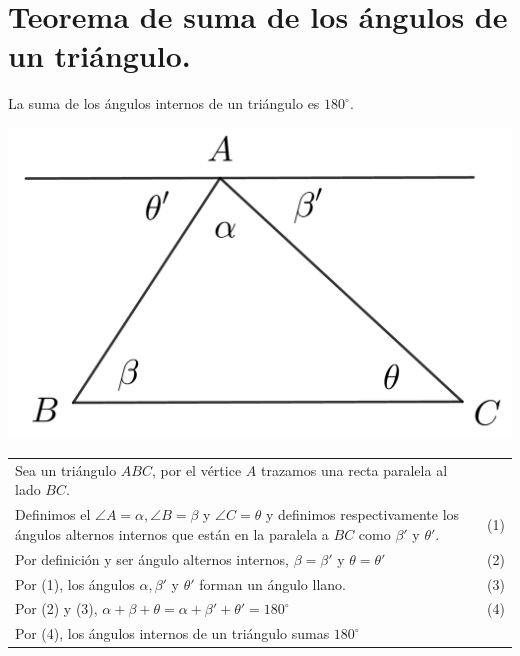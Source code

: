 \documentclass[12pt,a4paper,oneside]{book}
\begin{document}
\section{Teorema de suma de los ángulos de un triángulo.} 
La suma de los ángulos internos de un triángulo es $180^\circ$.
\\
\begin{center}
\includegraphics[scale=0.7]{Imagenes/demo1.png}
\end{center}
\begin{tabular}{p{15.9cm} p{1cm}}
Sea un triángulo $ABC$, por el vértice $A$ trazamos una recta paralela al lado $BC$. 
\\Definimos el $\angle A=\alpha, \angle B=\beta$ y $\angle C= \theta$ y definimos respectivamente los  ángulos alternos internos que están en la paralela a $BC$ como $\beta '$ y $\theta '$. & \medskip (1)
\\Por definición y ser ángulo alternos internos, $\beta= \beta '$ y $\theta=\theta '$ &(2)
\\Por (1), los ángulos $\alpha,\beta'$ y $\theta'$ forman un ángulo llano. & (3)
\\Por (2) y (3), $\alpha + \beta+ \theta = \alpha + \beta '+ \theta ' = 180^ \circ$ &(4)
\\Por (4), los  ángulos internos de un triángulo sumas $180^\circ$
\end{tabular}
\end{document}
